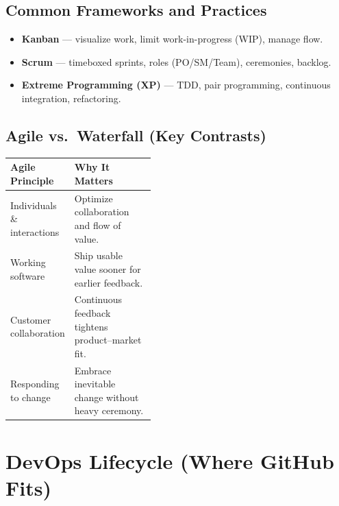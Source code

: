 \documentclass[11pt]{article}
\providecommand{\term}[1]{\textbf{#1}}
\newcommand{\gh}{GitHub}
\begin{document}
\subsection{Common Frameworks and Practices}
\begin{itemize}
  \item \term{Kanban} — visualize work, limit work-in-progress (WIP), manage flow.
  \item \term{Scrum} — timeboxed sprints, roles (PO/SM/Team), ceremonies, backlog.
  \item \term{Extreme Programming (XP)} — TDD, pair programming, continuous integration, refactoring.
\end{itemize}

\subsection{Agile vs.\ Waterfall (Key Contrasts)}
\begin{tabularx}{\linewidth}{@{}>{\raggedright\arraybackslash}p{0.42\linewidth} >{\raggedright\arraybackslash}X@{}}
\toprule
\textbf{Agile Principle} & \textbf{Why It Matters} \\
\midrule
Individuals \& interactions & Optimize collaboration and flow of value. \\
Working software & Ship usable value sooner for earlier feedback. \\
Customer collaboration & Continuous feedback tightens product--market fit. \\
Responding to change & Embrace inevitable change without heavy ceremony. \\
\bottomrule
\end{tabularx}
\clearpage

\section{DevOps Lifecycle (Where \gh{} Fits)}
\end{document}
